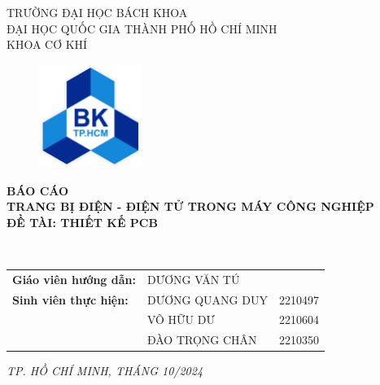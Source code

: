 \documentclass{article}
\begin{document}
\begin{titlepage}

    \begin{center}
        \vspace{-0.5cm}
        TRƯỜNG ĐẠI HỌC BÁCH KHOA \\
        ĐẠI HỌC QUỐC GIA THÀNH PHỐ HỒ CHÍ MINH \\
        KHOA CƠ KHÍ \\


    \begin{figure}[H]
        \centering
        \includegraphics[width=0.3\textwidth]{image/bachkhoa_logo.png}     
    \end{figure}
    \textbf{\fontsize{14pt}{1}\selectfont BÁO CÁO} \\
    \vspace{1cm}
    \textbf{\fontsize{16pt}{1}\selectfont TRANG BỊ ĐIỆN - ĐIỆN TỬ TRONG MÁY CÔNG NGHIỆP} \\
    \vspace{0.5cm}
    \textbf{\fontsize{16pt}{1}\selectfont ĐỀ TÀI: THIẾT KẾ PCB} \\
    \end{center}\
    \vspace{2cm}
    \begin{table}[H]
        \centering
        \begin{tabular}{l l l}
            \textbf{Giáo viên hướng dẫn:} & DƯƠNG VĂN TÚ \vspace{0.5cm} \\ 
            \textbf{Sinh viên thực hiện:} & DƯƠNG QUANG DUY & 2210497\\
                            & VÕ HỮU DƯ & 2210604\\
                            & ĐÀO TRỌNG CHÂN & 2210350\\   
        \end{tabular}
    \end{table}
    \vspace{3.5cm}
    \begin{center}
        \textit{\fontsize{14pt}{1}\selectfont TP. HỒ CHÍ MINH, THÁNG 10/2024}
    \end{center}
\end{titlepage}
\cleardoublepage
\end{document}
